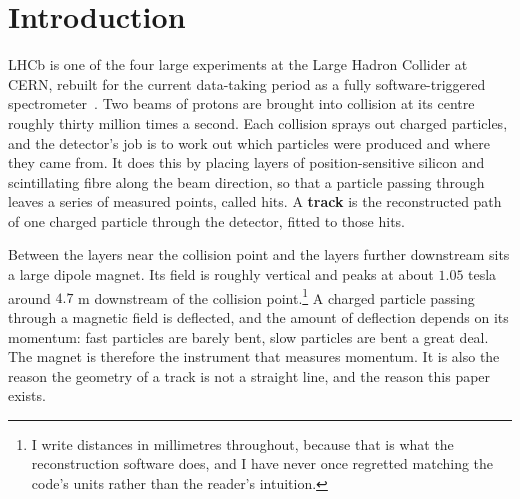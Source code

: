 \documentclass[11pt,a4paper]{article}
\newcommand{\um}{\ensuremath{\,\mu\mathrm{m}}}
\begin{document}
\begin{abstract}
the deviation from straight-line propagation normalised by a per-leg bending
integral built from the inputs alone, improved the two short leg types by
factors of $92$ and $190$ and moved both from thirty to fifty times worse than
ignoring the magnet to two to four times better than it, at $2.1\um$ on the
whole test split against $16.1\um$ for a straight line. Walked along real
particle paths the redesigned network is four to thirteen times more accurate
than its predecessor at every chain length. The remaining constraint is the
magnet crossing itself inside the shared network, $1026\um$ against a $46\um$
ceiling, which the redesign improved by only a factor $2.5$ and which now
dominates both the one-step and the chained error. The evidence base is
$232$ training runs.
\end{abstract}

\tableofcontents

\section{Introduction}
\label{sec:intro}

LHCb is one of the four large experiments at the Large Hadron Collider at CERN,
rebuilt for the current data-taking period as a fully software-triggered
spectrometer~\cite{lhcb2024upgrade}. Two beams of protons are brought into
collision at its centre roughly thirty million times a second. Each collision
sprays out charged particles, and the detector's job is to work out which
particles were produced and where they came from. It does this by placing layers
of position-sensitive silicon and scintillating fibre along the beam direction,
so that a particle passing through leaves a series of measured points, called
hits. A \textbf{track} is the reconstructed path of one charged particle through
the detector, fitted to those hits.

Between the layers near the collision point and the layers further downstream
sits a large dipole magnet. Its field is roughly vertical and peaks at about
$1.05$ tesla around $4.7$ m downstream of the collision point.\footnote{I
write distances in millimetres throughout, because that is what the
reconstruction software does, and I have never once regretted matching the
code's units rather than the reader's intuition.} A charged particle passing
through a magnetic field is deflected, and the amount of deflection depends on
its momentum: fast particles are barely bent, slow particles are bent a great
deal. The magnet is therefore the instrument that measures momentum. It is also
the reason the geometry of a track is not a straight line, and the reason this
paper exists.
\end{document}
